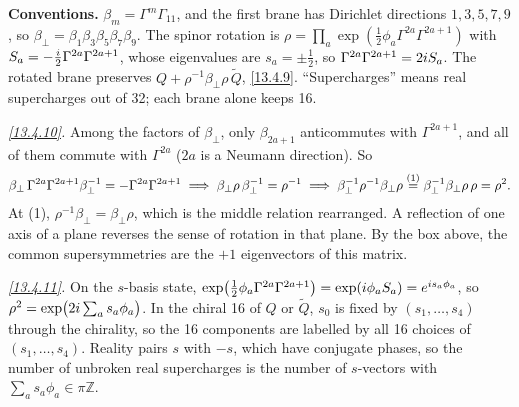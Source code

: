 \begin{tcolorbox}[breakable]
	\begin{remark}
		\textbf{Conventions.} $\beta_m=\Gamma^m\Gamma_{11}$, and the first brane has Dirichlet directions $1,3,5,7,9$, so $\beta_\perp=\beta_1\beta_3\beta_5\beta_7\beta_9$. The spinor rotation is $\rho=\prod_a\exp(\frac12\phi_a\Gamma^{2a}\Gamma^{2a+1})$ with $S_a=-\frac{i}{2}\Gamma^{2a}\Gamma^{2a+1}$, whose eigenvalues are $s_a=\pm\frac12$, so $\Gamma^{2a}\Gamma^{2a+1}=2i S_a$. The rotated brane preserves $Q+\rho^{-1}\beta_\perp\rho\,\tilde Q$, \eqref{13.4.9}. ``Supercharges'' means real supercharges out of 32; each brane alone keeps 16.

		\textit{\eqref{13.4.10}.} Among the factors of $\beta_\perp$, only $\beta_{2a+1}$ anticommutes with $\Gamma^{2a+1}$, and all of them commute with $\Gamma^{2a}$ ($2a$ is a Neumann direction). So
		\begin{align*}
			\beta_\perp\,\Gamma^{2a}\Gamma^{2a+1}\beta_\perp^{-1} = -\Gamma^{2a}\Gamma^{2a+1}
			\;\Longrightarrow\; \beta_\perp\rho\,\beta_\perp^{-1}=\rho^{-1}
			\;\Longrightarrow\; \beta_\perp^{-1}\rho^{-1}\beta_\perp\rho \overset{(1)}{=} \beta_\perp^{-1}\beta_\perp\rho\,\rho = \rho^2 .
		\end{align*}
		At (1), $\rho^{-1}\beta_\perp=\beta_\perp\rho$, which is the middle relation rearranged. A reflection of one axis of a plane reverses the sense of rotation in that plane. By the box above, the common supersymmetries are the $+1$ eigenvectors of this matrix.

		\textit{\eqref{13.4.11}.} On the $s$-basis state, $\exp(\frac12\phi_a\Gamma^{2a}\Gamma^{2a+1})=\exp(i\phi_aS_a)=e^{i s_a\phi_a}$, so $\rho^2=\exp\bigl(2i\sum_as_a\phi_a\bigr)$. In the chiral 16 of $Q$ or $\tilde Q$, $s_0$ is fixed by $(s_1,\dots,s_4)$ through the chirality, so the 16 components are labelled by all 16 choices of $(s_1,\dots,s_4)$. Reality pairs $s$ with $-s$, which have conjugate phases, so the number of unbroken real supercharges is the number of $s$-vectors with $\sum_as_a\phi_a\in\pi\mathbb Z$.


\end{remark}
\end{tcolorbox}
